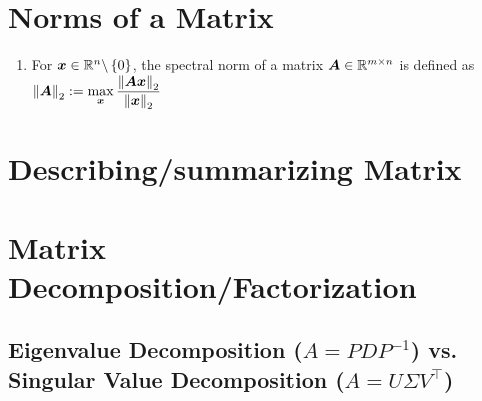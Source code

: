 \section{Norms of a Matrix}

\begin{enumerate}
    \item \begin{definition}
        For $\bm{x} \in \mathbb{R}^n\backslash \left\{0\right\}$, the spectral norm of a matrix $\bm{A} \in \mathbb{R}^{m\times n}$ is defined as
        $
            \left\| \bm{A} \right\|_2 
            := \displaystyle\max_{\bm{x}} \dfrac{\left\| \bm{Ax} \right\|_2}{\left\| \bm{x} \right\|_2}
        $
        \hfill \cite{mfml/book/mml/Deisenroth-Faisal-Ong}
    \end{definition}
\end{enumerate}





\section{Describing/summarizing Matrix}







\section{Matrix Decomposition/Factorization}





\subsection{Eigenvalue Decomposition ($A = P DP ^{-1}$) vs. Singular Value Decomposition ($A = U \Sigma V^\top$)}

